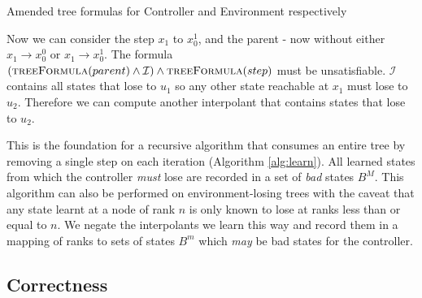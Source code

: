 \documentclass{llncs}
\newcommand{\textoverline}[1]{$\overline{\mbox{#1}}$}
\begin{document}
\begin{algorithm}
    \caption{Amended tree formulas for Controller and Environment respectively}
    \label{alg:unboundedTreeFormula}
    \begin{algorithmic}[1]
        \State {}
        \Else
        \State {}
        \EndIf
        \EndFunction
    \end{algorithmic}

    \begin{algorithmic}
        \Function{\textoverline{treeFormula}}{gt}
        \State {}
        \Else
        \State {}
        \EndIf
        \EndFunction
    \end{algorithmic}
\end{algorithm}

Now we can consider the step $x_1$ to $x_0^1$, and the parent - now without
either $x_1 \to x_0^0$ or $x_1 \to x_0^1$. The formula
$(\textsc{treeFormula}(parent) \land \mathcal{I}) \land
\textsc{treeFormula}(step)$ must be unsatisfiable. $\mathcal{I}$ contains all
states that lose to $u_1$ so any other state reachable at $x_1$ must lose to
$u_2$. Therefore we can compute another interpolant that contains states that
lose to $u_2$.

This is the foundation for a recursive algorithm that consumes an entire tree
by removing a single step on each iteration (Algorithm \ref{alg:learn}). All
learned states from which the controller \emph{must} lose are recorded in a set
of \emph{bad} states $B^M$.  This algorithm can also be performed on
environment-losing trees with the caveat that any state learnt at a node of
rank $n$ is only known to lose at ranks less than or equal to $n$. We negate
the interpolants we learn this way and record them in a mapping of ranks to
sets of states $B^m$ which \emph{may} be bad states for the controller.

\subsection{Correctness}
\end{document}

